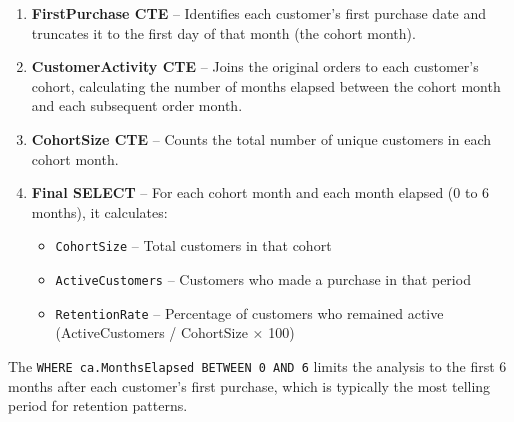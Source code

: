 \documentclass[
  letterpaper,
  DIV=11,
  numbers=noendperiod]{scrartcl}
\providecommand{\tightlist}{%
  \setlength{\itemsep}{0pt}\setlength{\parskip}{0pt}}\usepackage{longtable,booktabs,array}
\begin{document}
\begin{enumerate}
\def\labelenumi{\arabic{enumi}.}
\item
  \textbf{FirstPurchase CTE} -- Identifies each customer's first
  purchase date and truncates it to the first day of that month (the
  cohort month).
\item
  \textbf{CustomerActivity CTE} -- Joins the original orders to each
  customer's cohort, calculating the number of months elapsed between
  the cohort month and each subsequent order month.
\item
  \textbf{CohortSize CTE} -- Counts the total number of unique customers
  in each cohort month.
\item
  \textbf{Final SELECT} -- For each cohort month and each month elapsed
  (0 to 6 months), it calculates:

  \begin{itemize}
  \tightlist
  \item
    \texttt{CohortSize} -- Total customers in that cohort
  \item
    \texttt{ActiveCustomers} -- Customers who made a purchase in that
    period
  \item
    \texttt{RetentionRate} -- Percentage of customers who remained
    active (ActiveCustomers / CohortSize × 100)
  \end{itemize}
\end{enumerate}

The \texttt{WHERE\ ca.MonthsElapsed\ BETWEEN\ 0\ AND\ 6} limits the
analysis to the first 6 months after each customer's first purchase,
which is typically the most telling period for retention patterns.
\end{document}
